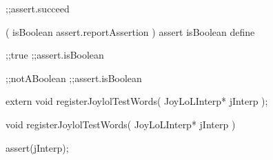 \startJoylolTest
  ;;assert.succeed
\stopJoylolTest
\stopTestCase
\stopTestSuite

\startJoylolCode
(
  isBoolean
  assert.reportAssertion
)
assert
isBoolean
define
\stopJoylolCode

\startJoylolTest
  ;;true
  ;;assert.isBoolean
\stopJoylolTest
\stopTestCase

\startJoylolTest
  ;;notABoolean
  ;;assert.isBoolean
\stopJoylolTest
\stopTestCase
\stopTestSuite

\startTestSuite[assertTrue]

\stopTestSuite

\startTestSuite[assertFalse]

\stopTestSuite

\startTestSuite[assertNil]

\stopTestSuite

\startTestSuite[assertNotNil]

\stopTestSuite

\startTestSuite[assertAtom]

\stopTestSuite

\startTestSuite[assertPair]

\stopTestSuite

\startTestSuite[assertNatural]

\stopTestSuite

\startTestSuite[assertSymbol]

\stopTestSuite

\startTestSuite[assertContext]

\stopTestSuite

\startTestSuite[assertDictionary]

\stopTestSuite

\startTestSuite[assertDictNode]

\stopTestSuite


\startCHeader
extern void registerJoylolTestWords(
  JoyLoLInterp* jInterp
);
\stopCHeader
{}

\startCCode
void registerJoylolTestWords(
  JoyLoLInterp* jInterp
) {
  assert(jInterp);

}
\stopCCode